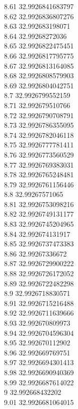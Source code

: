 {8.61	32.9926841683797\\
8.62	32.9926836807276\\
8.63	32.992683198071\\
8.64	32.99268272036\\
8.65	32.9926822475451\\
8.66	32.9926817795775\\
8.67	32.9926813164085\\
8.68	32.9926808579903\\
8.69	32.9926804042751\\
8.7	32.9926799552159\\
8.71	32.992679510766\\
8.72	32.9926790708791\\
8.73	32.9926786355095\\
8.74	32.9926782046118\\
8.75	32.9926777781411\\
8.76	32.9926773560529\\
8.77	32.9926769383031\\
8.78	32.9926765248481\\
8.79	32.9926761156446\\
8.8	32.99267571065\\
8.81	32.9926753098216\\
8.82	32.9926749131177\\
8.83	32.9926745204965\\
8.84	32.992674131917\\
8.85	32.9926737473383\\
8.86	32.99267336672\\
8.87	32.9926729900222\\
8.88	32.9926726172052\\
8.89	32.9926722482298\\
8.9	32.9926718830571\\
8.91	32.9926715216488\\
8.92	32.9926711639666\\
8.93	32.992670809973\\
8.94	32.9926704596304\\
8.95	32.992670112902\\
8.96	32.992669769751\\
8.97	32.9926694301413\\
8.98	32.9926690940369\\
8.99	32.9926687614022\\
9	32.992668432202\\
9.01	32.9926681064015\\
}
